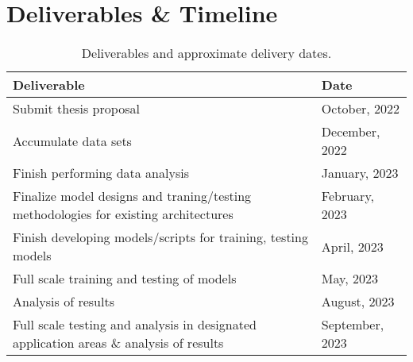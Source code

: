 \documentclass[10pt]{article}
\begin{document}
    \section{Deliverables \& Timeline}
        \begin{table}[h!]
            \centering
            \begin{tabular}{l|l}
                \textbf{Deliverable} & \textbf{Date} \\
                \hline
                Submit thesis proposal & October, 2022 \\
                Accumulate data sets\footnotemark[4] & December, 2022 \\
                Finish performing data analysis\footnotemark[5] & January, 2023 \\
                Finalize model designs and traning/testing methodologies for existing architectures & February, 2023 \\
                Finish developing models/scripts for training, testing models & April, 2023 \\
                Full scale training and testing of models & May, 2023 \\
                Analysis of results\footnotemark[6] & August, 2023 \\
                Full scale testing and analysis in designated application areas \& analysis of results & September, 2023 \\
            \end{tabular}
            \label{table:timeline}
            \caption{Deliverables and approximate delivery dates.}
        \end{table}

    \newpage
\end{document}
